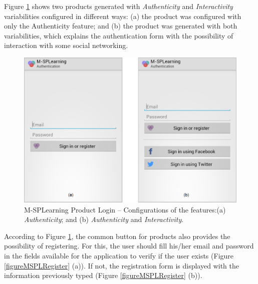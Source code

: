 Figure \ref{figureMSPLLogin} shows two products generated with \textit{Authenticity} and \textit{Interactivity} variabilities configured in different ways: (a) the product was configured with only the Authenticity feature; and (b) the product was generated with both variabilities, which explains the authentication form with the possibility of interaction with some social networking.

\begin{figure}
\centering
\includegraphics[scale=0.33]{figures/section3/MSPLLogin}
\caption{M-SPLear\allowbreak ning Product Login -- Configurations of the features:\newline(a) \textit{Authenticity}; and (b) \textit{Authenticity} and \textit{Interactivity}.}
\label{figureMSPLLogin}
\end{figure}

According to Figure \ref{figureMSPLLogin}, the common button for products also provides the possibility of registering. For this, the user should fill his/her email and password in the fields available for the application to verify if the user exists (Figure \ref{figureMSPLRegister} (a)). If not, the registration form is displayed with the information previously typed (Figure \ref{figureMSPLRegister} (b)).

